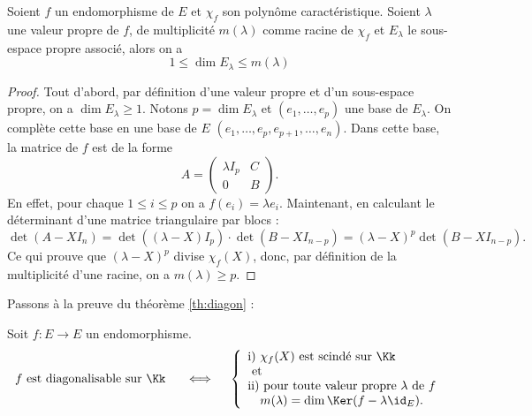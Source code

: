 \documentclass[12pt, class=report,crop=false]{standalone}
\begin{document}
\begin{proposition}

Soient $f$ un endomorphisme de $E$ et $\chi_f$ son polynôme caractéristique.
Soient $\lambda$ une valeur propre de $f$, de multiplicité $m(\lambda)$ comme racine de $\chi_f$ 
et $E_\lambda$ le sous-espace propre associé, alors on a
$$1\leq \dim E_\lambda\leq m(\lambda)$$
\end{proposition} 


\begin{proof}
Tout d'abord, par définition d'une valeur propre et d'un sous-espace propre, on a $\dim E_\lambda\geq 1$.
Notons $p=\dim E_\lambda$ et $(e_1,\dots,e_p)$ une base de $E_\lambda$.
 On complète cette base en une base de $E$
$(e_1,\dots,e_p,e_{p+1},\dots,e_n)$.
Dans cette base, la matrice de $f$ est de la forme
$$A=
\left(\begin{array}{c|c}
\lambda I_p & C \\ \hline 
 0 & B\end{array}\right).$$
En effet, pour chaque $1\le i \le p$ on a $f(e_i) = \lambda e_i$. 
Maintenant, en calculant le déterminant d'une matrice triangulaire par blocs :
$\det(A-XI_n)=\det((\lambda-X)I_p) \cdot \det(B-XI_{n-p})=(\lambda-X)^p\det(B-XI_{n-p}).$
Ce qui prouve que $(\lambda-X)^p$ divise $\chi_f(X)$, donc, par définition 
de la multiplicité d'une racine, on a $m(\lambda) \ge p$. 
\end{proof} 



Passons à la preuve du théorème \ref{th:diagon} :
\begin{theoreme}
Soit $f :  E \to E$ un endomorphisme.
\[f \text{ est diagonalisable sur $\Kk$ } \quad\iff\quad \left\{\begin{array}{l}
\text{i) } \chi_f(X) \mbox{ est scindé sur $\Kk$}\\
\text{ et }\\
\text{ii) pour toute valeur propre $\lambda$ de $f$} \\ \quad m(\lambda) = \dim \Ker(f-\lambda \id_E).
\end{array}\right.\]
\end{theoreme}
\end{document}
